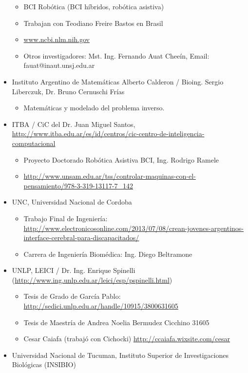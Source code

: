 \begin{itemize}
\begin{itemize}
\item BCI Robótica (BCI híbridos, robótica asistiva)
\item Trabajan con Teodiano Freire Bastos en Brasil
\item \url{www.ncbi.nlm.nih.gov}
\item Otros investigadores: Mst. Ing. Fernando Auat Cheeín, Email: fauat@inaut.unsj.edu.ar
\end{itemize}
\item Instituto Argentino de Matemáticas Alberto Calderon / Bioing. Sergio Liberczuk, Dr. Bruno Cernuschi Frías
\begin{itemize}
\item Matemáticas y modelado del problema inverso.
\end{itemize}
\item ITBA / CiC del Dr. Juan Miguel Santos, \url{http://www.itba.edu.ar/es/id/centros/cic-centro-de-inteligencia-computacional}
\begin{itemize}
\item Proyecto Doctorado Robótica Asistiva BCI, Ing. Rodrigo Ramele
\item \url{http://www.unsam.edu.ar/tss/controlar-maquinas-con-el-pensamiento/978-3-319-13117-7_142}
\end{itemize}
\item UNC, Universidad Nacional de Cordoba
\begin{itemize}
\item Trabajo Final de Ingeniería: \url{http://www.electronicosonline.com/2013/07/08/crean-jovenes-argentinos-interface-cerebral-para-discapacitados/}
\item Carrera de Ingeniería Biomédica: Ing. Diego Beltramone
\end{itemize}
\item UNLP, LEICI / Dr. Ing. Enrique Spinelli (\url{http://www.ing.unlp.edu.ar/leici/esp/pspinelli.html})
\begin{itemize}
\item Tesis de Grado de García Pablo: \url{http://sedici.unlp.edu.ar/handle/10915/3800631605}
\item Tesis de Maestría de Andrea Noelia Bermudez Cicchino 31605
\item Cesar Caiafa (trabajó con Cichocki) \url{http://ccaiafa.wixsite.com/cesar}
\end{itemize}
\item Universidad Nacional de Tucuman, Instituto Superior de Investigaciones Biológicas (INSIBIO)
\begin{itemize}

\end{itemize}
\end{itemize}
